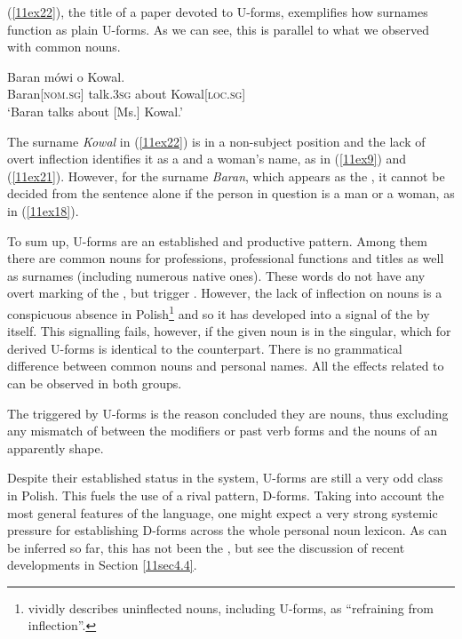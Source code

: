 \documentclass[output=paper,colorlinks,citecolor=brown]{langscibook}
\begin{document}
(\ref{11ex22}), the title of a paper devoted to U-forms, exemplifies how surnames function as plain U-forms. As we can see, this is parallel to what we observed with common nouns.

\begin{exe}
	\ex \label{11ex22}
	\gll Baran mówi o Kowal. \\
	Baran\textsc{[nom.sg]} talk.\textsc{3sg} about Kowal\textsc{[loc.sg]} \\
	\trans ‘Baran talks about [Ms.] Kowal.’ \hfill \citep{pawlowski1951}
\end{exe}

The surname \emph{Kowal} in (\ref{11ex22}) is in a non-subject position and the lack of overt inflection identifies it as a  and a woman's name, as in (\ref{11ex9}) and (\ref{11ex21}). However, for the surname \emph{Baran}, which appears as the , it cannot be decided from the sentence alone if the person in question is a man or a woman, as in (\ref{11ex18}).

To sum up, U-forms are an established and productive pattern. Among them there are common nouns for professions, professional functions and titles as well as surnames (including numerous native ones). These words do not have any overt marking of the  , but trigger  . However, the lack of inflection on nouns is a conspicuous absence in Polish\footnote{\citet[35]{krzyzanowski2013} vividly describes uninflected nouns, including U-forms, as ``refraining from inflection''.} and so it has developed into a signal of the   by itself. This signalling fails, however, if the given noun is in the  singular, which for derived U-forms is identical to the  counterpart. There is no grammatical difference between common nouns and personal names. All the effects related to  can be observed in both groups.

The   triggered by U-forms is the reason \citet[61, 68]{kucala1978} concluded they are  nouns, thus excluding any mismatch of  between the modifiers or past verb forms and the nouns of an apparently  shape.

Despite their established status in the system, U-forms are still a very odd class in Polish. This fuels the use of a rival pattern, D-forms. Taking into account the most general features of the language, one might expect a very strong systemic pressure for establishing D-forms across the whole personal noun lexicon. As can be inferred so far, this has not been the , but see the discussion of recent developments in Section \ref{11sec4.4}.
\end{document}
